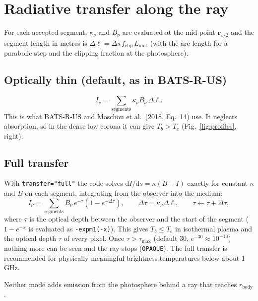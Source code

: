\documentclass[11pt,a4paper]{article}
\newcommand{\code}[1]{\texttt{#1}}
\newcommand{\vect}[1]{\bm{#1}}
\newcommand{\dd}{\mathrm{d}}
\begin{document}
\section{Radiative transfer along the ray}\label{sec:transfer}

For each accepted segment, $\kappa_\nu$ and $B_\nu$ are evaluated at the mid-point $\vect r_{1/2}$
and the segment length in metres is $\Delta\ell=\Delta s\,f_\text{clip}\,L_\text{unit}$ (with the arc
length for a parabolic step and the clipping fraction at the photosphere).

\subsection{Optically thin (default, as in BATS-R-US)}
\begin{equation}
  I_\nu=\sum_\text{segments}\kappa_\nu B_\nu\,\Delta\ell .
  \label{eq:thin}
\end{equation}
This is what BATS-R-US and Moschou et al.\ (2018, Eq.~14) use. It neglects absorption, so in the
dense low corona it can give $T_b>T_e$ (Fig.~\ref{fig:profiles}, right).

\subsection{Full transfer}
With \code{transfer="full"} the code solves $\dd I/\dd s=\kappa(B-I)$ exactly for constant
$\kappa$ and $B$ on each segment, integrating from the observer into the medium:
\begin{equation}
  I_\nu=\sum_\text{segments}B_\nu\,e^{-\tau}\left(1-e^{-\Delta\tau}\right),\qquad
  \Delta\tau=\kappa_\nu\Delta\ell,\qquad \tau\leftarrow\tau+\Delta\tau,
  \label{eq:full}
\end{equation}
where $\tau$ is the optical depth between the observer and the start of the segment
($1-e^{-x}$ is evaluated as \code{-expm1(-x)}). This gives $T_b\le T_e$ in isothermal plasma and the
optical depth $\tau$ of every pixel. Once $\tau>\tau_\text{max}$ (default 30,
$e^{-30}\approx10^{-13}$) nothing more can be seen and the ray stops (\code{OPAQUE}). The full
transfer is recommended for physically meaningful brightness temperatures below about 1\,GHz.

Neither mode adds emission from the photosphere behind a ray that reaches $r_\text{body}$.
\end{document}
